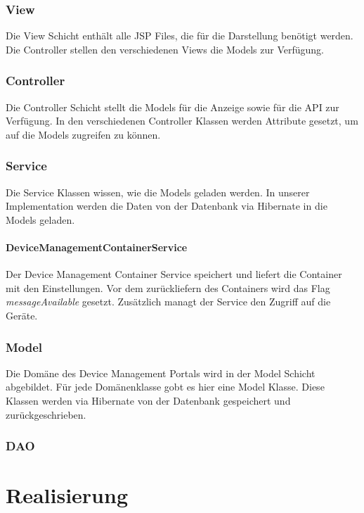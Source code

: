 \subsubsection{View}
Die View Schicht enthält alle JSP Files, die für die Darstellung benötigt werden. Die Controller stellen den verschiedenen Views die Models zur Verfügung.

\subsubsection{Controller}
Die Controller Schicht stellt die Models für die Anzeige sowie für die API zur Verfügung. In den verschiedenen Controller Klassen werden Attribute gesetzt, um auf die Models zugreifen zu können.

\subsubsection{Service}
Die Service Klassen wissen, wie die Models geladen werden. In unserer Implementation werden die Daten von der Datenbank via Hibernate in die Models geladen.

\paragraph{DeviceManagementContainerService}
Der Device Management Container Service speichert und liefert die Container mit den Einstellungen. Vor dem zurückliefern des Containers wird das Flag \textit{messageAvailable} gesetzt. Zusätzlich managt der Service den Zugriff auf die Geräte. 

\subsubsection{Model}
Die Domäne des Device Management Portals wird in der Model Schicht abgebildet. Für jede Domänenklasse gobt es hier eine Model Klasse. Diese Klassen werden via Hibernate von der Datenbank gespeichert und zurückgeschrieben.

\subsubsection{DAO}


\section{Realisierung}